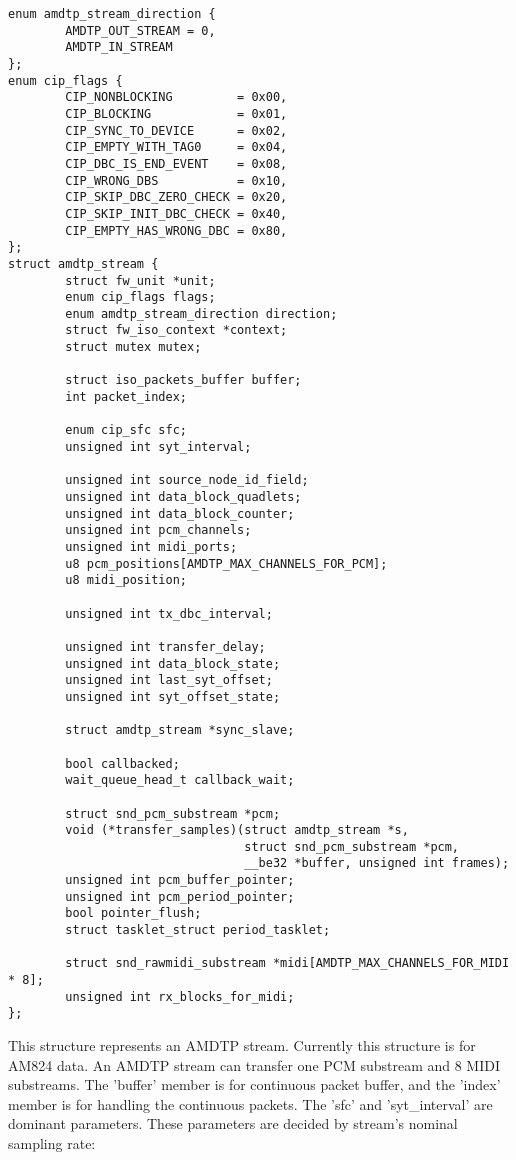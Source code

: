 \documentclass[onecolumn]{jarticle}
\begin{document}
\begin{verbatim}
enum amdtp_stream_direction {
        AMDTP_OUT_STREAM = 0,
        AMDTP_IN_STREAM
};
enum cip_flags {
        CIP_NONBLOCKING         = 0x00,
        CIP_BLOCKING            = 0x01,
        CIP_SYNC_TO_DEVICE      = 0x02,
        CIP_EMPTY_WITH_TAG0     = 0x04,
        CIP_DBC_IS_END_EVENT    = 0x08,
        CIP_WRONG_DBS           = 0x10,
        CIP_SKIP_DBC_ZERO_CHECK = 0x20,
        CIP_SKIP_INIT_DBC_CHECK = 0x40,
        CIP_EMPTY_HAS_WRONG_DBC = 0x80,
};
struct amdtp_stream {
        struct fw_unit *unit;
        enum cip_flags flags;
        enum amdtp_stream_direction direction;
        struct fw_iso_context *context;
        struct mutex mutex;

        struct iso_packets_buffer buffer;
        int packet_index;

        enum cip_sfc sfc;
        unsigned int syt_interval;

        unsigned int source_node_id_field;
        unsigned int data_block_quadlets;
        unsigned int data_block_counter;
        unsigned int pcm_channels;
        unsigned int midi_ports;
        u8 pcm_positions[AMDTP_MAX_CHANNELS_FOR_PCM];
        u8 midi_position;

        unsigned int tx_dbc_interval;

        unsigned int transfer_delay;
        unsigned int data_block_state;
        unsigned int last_syt_offset;
        unsigned int syt_offset_state;

        struct amdtp_stream *sync_slave;

        bool callbacked;
        wait_queue_head_t callback_wait;

        struct snd_pcm_substream *pcm;
        void (*transfer_samples)(struct amdtp_stream *s,
                                 struct snd_pcm_substream *pcm,
                                 __be32 *buffer, unsigned int frames);
        unsigned int pcm_buffer_pointer;
        unsigned int pcm_period_pointer;
        bool pointer_flush;
        struct tasklet_struct period_tasklet;

        struct snd_rawmidi_substream *midi[AMDTP_MAX_CHANNELS_FOR_MIDI * 8];
        unsigned int rx_blocks_for_midi;
};
\end{verbatim}

This structure represents an AMDTP stream. Currently this structure is for AM824 data. An AMDTP stream can transfer one PCM substream and 8 MIDI substreams. The 'buffer' member is for continuous packet buffer, and the 'index' member is for handling the continuous packets. The 'sfc' and 'syt\_interval' are dominant parameters. These parameters are decided by stream's nominal sampling rate:
\end{document}
